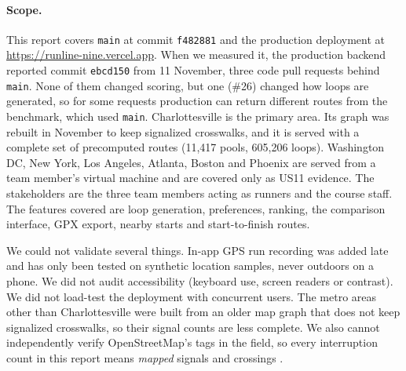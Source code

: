 \paragraph{Scope.}
This report covers \texttt{main} at commit \texttt{f482881}
\citep{runline2026repo} and the production deployment at
\url{https://runline-nine.vercel.app}. When we measured it, the production
backend reported commit \texttt{ebcd150} from 11 November, three code
pull requests behind \texttt{main}. None of them changed scoring, but one
(\#26) changed how loops are generated, so for some requests production can
return different routes from the benchmark, which used \texttt{main}. Charlottesville
is the primary area. Its graph was rebuilt in November to keep signalized
crosswalks, and it is served with a complete set of precomputed routes
(11,417 pools, 605,206 loops). Washington DC, New York, Los Angeles, Atlanta,
Boston and Phoenix are served from a team member's virtual machine and are
covered only as US11 evidence. The stakeholders are the three team members
acting as runners and the course staff. The features covered are loop
generation, preferences, ranking, the comparison interface, GPX export,
nearby starts and start-to-finish routes.

We could not validate several things. In-app GPS run recording was added late
and has only been tested on synthetic location samples, never outdoors on a
phone. We did not audit accessibility (keyboard use, screen readers or
contrast). We did not load-test the deployment with concurrent users. The
metro areas other than Charlottesville were built from an older map graph
that does not keep signalized crosswalks, so their signal counts are less
complete. We also cannot independently verify OpenStreetMap's tags in the
field, so every interruption count in this report means \emph{mapped}
signals and crossings \citep{osmwiki2026signals}.
